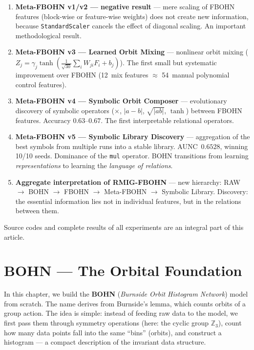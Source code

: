 \documentclass[11pt,a4paper]{report}
\begin{document}
\begin{enumerate}
\item \textbf{Meta-FBOHN v1/v2 --- negative result} --- mere scaling of FBOHN features (block-wise or feature-wise weights) does not create new information, because \texttt{StandardScaler} cancels the effect of diagonal scaling. An important methodological result.

\item \textbf{Meta-FBOHN v3 --- Learned Orbit Mixing} --- nonlinear orbit mixing ($Z_j = \gamma_j \tanh(\frac{1}{\sqrt{30}} \sum_i W_{ji} F_i + b_j)$). The first small but systematic improvement over FBOHN (12~mix features $\approx$ 54~manual polynomial control features).

\item \textbf{Meta-FBOHN v4 --- Symbolic Orbit Composer} --- evolutionary discovery of symbolic operators ($\times$, $|a{-}b|$, $\sqrt{|ab|}$, $\tanh$) between FBOHN features. Accuracy $0.63$--$0.67$. The first interpretable relational operators.

\item \textbf{Meta-FBOHN v5 --- Symbolic Library Discovery} --- aggregation of the best symbols from multiple runs into a stable library. AUNC~$0.6528$, winning 10/10 seeds. Dominance of the \texttt{mul} operator. BOHN transitions from learning \emph{representations} to learning the \emph{language of relations}.

\item \textbf{Aggregate interpretation of RMIG-FBOHN} --- new hierarchy: RAW $\to$ BOHN $\to$ FBOHN $\to$ Meta-FBOHN $\to$ Symbolic Library. Discovery: the essential information lies not in individual features, but in the relations between them.
\end{enumerate}

Source codes and complete results of all experiments are an integral part of this article.



\chapter{BOHN --- The Orbital Foundation}

In this chapter, we build the \textbf{BOHN} (\emph{Burnside Orbit Histogram Network}) model from scratch. The name derives from Burnside's lemma, which counts orbits of a group action. The idea is simple: instead of feeding raw data to the model, we first pass them through symmetry operations (here: the cyclic group $\mathbb{Z}_3$), count how many data points fall into the same ``bins'' (orbits), and construct a histogram --- a compact description of the invariant data structure.
\end{document}
